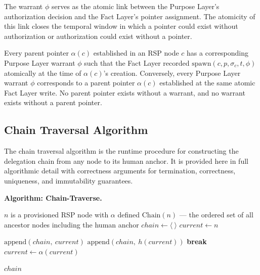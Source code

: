 The warrant $\phi$ serves as the atomic link between the Purpose Layer's authorization decision and the Fact Layer's pointer assignment. The atomicity of this link closes the temporal window in which a pointer could exist without authorization or authorization could exist without a pointer.

\begin{prop}
\label{prop:spawn-auth-completeness}
Every parent pointer $\alpha(c)$ established in an RSP node $c$ has a corresponding Purpose Layer warrant $\phi$ such that the Fact Layer recorded $\mathrm{spawn}(c, p, \sigma_c, t, \phi)$ atomically at the time of $\alpha(c)$'s creation. Conversely, every Purpose Layer warrant $\phi$ corresponds to a parent pointer $\alpha(c)$ established at the same atomic Fact Layer write. No parent pointer exists without a warrant, and no warrant exists without a parent pointer.
\end{prop}

\subsection{Chain Traversal Algorithm}
\label{sec:chain-traversal-algorithm}

The chain traversal algorithm is the runtime procedure for constructing the delegation chain from any node to its human anchor. It is provided here in full algorithmic detail with correctness arguments for termination, correctness, uniqueness, and immutability guarantees.

\medskip
\noindent\textbf{Algorithm: Chain-Traverse.}

\begin{algorithm}
\caption{Chain-Traverse($n$) --- Build the delegation chain from node $n$ to the human anchor}
\label{alg:chain-traverse}
\begin{algorithmic}[1]
\REQUIRE $n$ is a provisioned RSP node with $\alpha$ defined
\ENSURE $\mathrm{Chain}(n)$ --- the ordered set of all ancestor nodes including the human anchor
\STATE $chain \leftarrow \langle\ \rangle$ 
\STATE $current \leftarrow n$ 

    \STATE $\mathrm{append}(chain,\ current)$ 
        \STATE $\mathrm{append}(chain,\ h(current))$ 
        \STATE \textbf{break}
    \ENDIF
    \STATE $current \leftarrow \alpha(current)$ 
\ENDWHILE

\RETURN $chain$
\end{algorithmic}
\end{algorithm}

